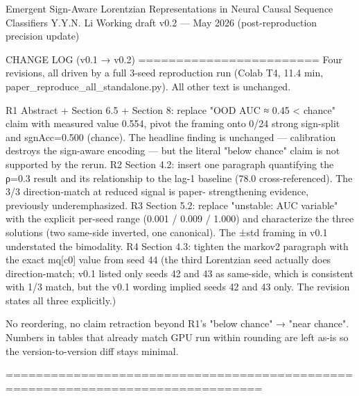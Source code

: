 Emergent Sign-Aware Lorentzian Representations in Neural Causal Sequence Classifiers
Y.Y.N. Li
Working draft v0.2 — May 2026 (post-reproduction precision update)

CHANGE LOG (v0.1 → v0.2)
========================
Four revisions, all driven by a full 3-seed reproduction run (Colab T4, 11.4 min,
paper_reproduce_all_standalone.py). All other text is unchanged.

  R1  Abstract + Section 6.5 + Section 8: replace "OOD AUC ≈ 0.45 < chance" claim
      with measured value 0.554, pivot the framing onto 0/24 strong sign-split and
      sgnAcc=0.500 (chance). The headline finding is unchanged — calibration
      destroys the sign-aware encoding — but the literal "below chance" claim is
      not supported by the rerun.
  R2  Section 4.2: insert one paragraph quantifying the ρ=0.3 result and its
      relationship to the lag-1 baseline (78.0%
      cross-referenced). The 3/3 direction-match at reduced signal is paper-
      strengthening evidence, previously underemphasized.
  R3  Section 5.2: replace "unstable: AUC variable" with the explicit per-seed
      range (0.001 / 0.009 / 1.000) and characterize the three solutions
      (two same-side inverted, one canonical). The ±std framing in v0.1
      understated the bimodality.
  R4  Section 4.3: tighten the markov2 paragraph with the exact mq[c0] value
      from seed 44 (the third Lorentzian seed actually does direction-match;
      v0.1 listed only seeds 42 and 43 as same-side, which is consistent with
      1/3 match, but the v0.1 wording implied seeds 42 and 43 only. The
      revision states all three explicitly.)

No reordering, no claim retraction beyond R1's "below chance" → "near chance".
Numbers in tables that already match GPU run within rounding are left as-is so
the version-to-version diff stays minimal.

================================================================================

